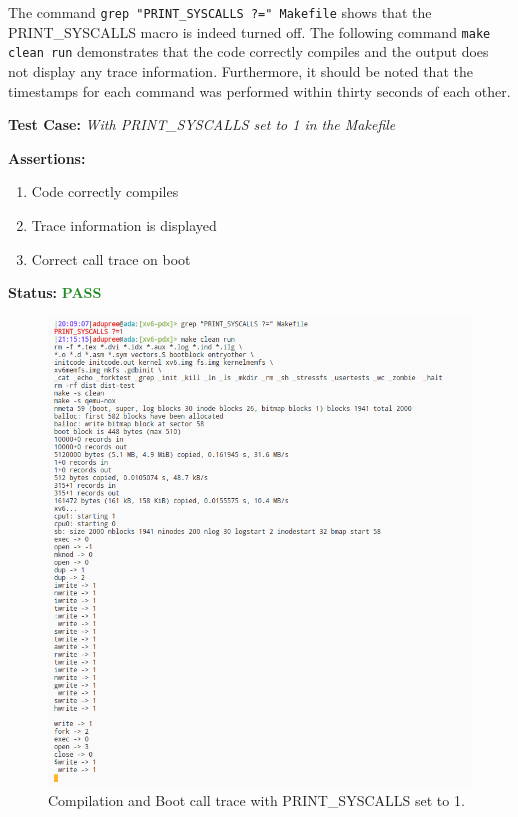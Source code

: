 \documentclass[11pt,letterpaper]{report}
\newcommand{\code}[1]{\colorbox{codegray}{\texttt{#1}}}
\begin{document}
{  The command \code{grep "PRINT\_SYSCALLS ?=" Makefile} shows that the PRINT\_SYSCALLS macro is indeed turned off.
  The following command \code{make clean run} demonstrates that the code correctly compiles and the output does not display any trace information.
  Furthermore, it should be noted that the timestamps for each command was performed within thirty seconds of each other.
  
\pagebreak

  \noindent\textbf{Test Case:} \emph{With PRINT\_SYSCALLS set to 1 in the Makefile}
  
  \noindent\textbf{Assertions:}
  \begin{enumerate}[]
  \item Code correctly compiles
  \item Trace information is displayed
  \item Correct call trace on boot
  \end{enumerate}  
  
  \noindent\textbf{Status:} \textcolor{ForestGreen}{\textbf{PASS}} \hfill \break
  
  \begin{figure}[h!]
	\centering
	\includegraphics[height=\linewidth]{test2.png}
	\caption[PRINT\_SYSCALLS=0]{Compilation and Boot call trace with PRINT\_SYSCALLS set to 1.}
	\label{fig:P1compileP0-1}
  \end{figure}

}
\end{document}
